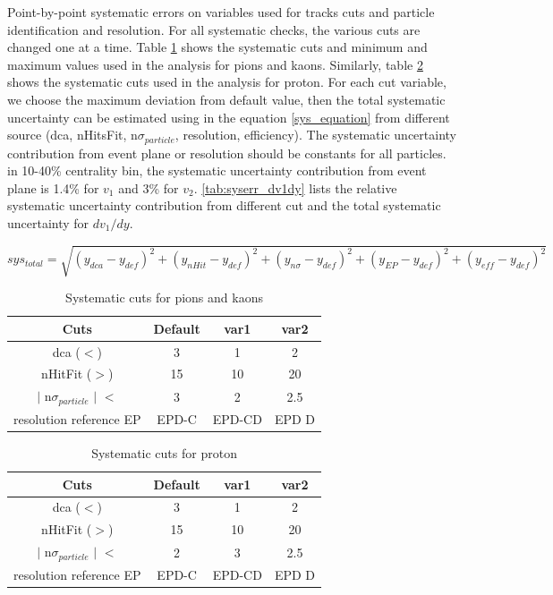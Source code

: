 Point-by-point systematic errors on variables used for tracks cuts and particle identification and resolution. For all systematic checks, the various cuts are changed one at a time. Table \ref{sys_cut_pionkaon} shows the systematic cuts and minimum and maximum values used in the analysis for pions and kaons. Similarly, table \ref{sys_cut_proton} shows the systematic cuts used in the analysis for proton. 
For each cut variable, we choose the maximum deviation from default value, then the total systematic uncertainty can be estimated using in the equation \ref{sys_equation} from different source (dca, nHitsFit, n$\sigma_{particle}$, resolution, efficiency). The systematic uncertainty contribution from event plane or resolution should be constants for all particles. in 10-40\% centrality bin, the systematic uncertainty contribution from event plane is 1.4\% for $v_{1}$ and 3\% for $v_{2}$. \ref{tab:syserr_dv1dy} lists the relative systematic uncertainty contribution from different cut and the total systematic uncertainty for $dv_{1}/dy$.

\begin{equation}
	sys_{total}=\sqrt{(y_{dca}-y_{def})^{2} + (y_{nHit}-y_{def})^{2} + (y_{n\sigma}-y_{def})^{2} + (y_{EP}-y_{def})^{2} + (y_{eff}-y_{def})^{2}}
\label{sys_equation}
\end{equation}

\begin{table}[ht]
\caption{Systematic cuts for pions and kaons}
\label{sys_cut_pionkaon}
\begin{tabular}{cccc}
\hline
Cuts & Default & var1 & var2\\ 
\hline
dca ($<$) & 3 & 1 & 2\\ 
nHitFit ($>$) & 15 & 10 & 20\\ 
$|$ n$\sigma_{particle}$ $|$ $<$ & 3 & 2 & 2.5 \\ 
resolution reference EP & EPD-C & EPD-CD & EPD D\\ 
\hline
\end{tabular} 
\end{table}


\begin{table}[ht]
\caption{Systematic cuts for proton}
\label{sys_cut_proton}
\begin{tabular}{cccc}
\hline
Cuts & Default & var1 & var2\\ 
\hline
dca ($<$) & 3 & 1 & 2\\ 
nHitFit ($>$) & 15 & 10 & 20\\ 
$|$ n$\sigma_{particle}$ $|$ $<$ & 2 & 3 & 2.5 \\ 
resolution reference EP & EPD-C & EPD-CD & EPD D\\ 
\hline
\end{tabular} 
\end{table}

